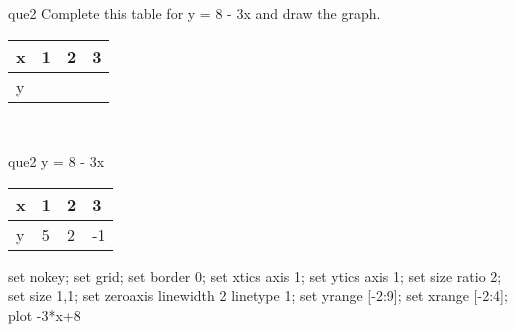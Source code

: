 \documentclass[13.5pt, varwidth=true]{beamer}
\begin{document}
\begin{frame}[shrink=19,fragile]
	\begin{beamercolorbox}[rounded=true, left, shadow=true,wd=14.8cm]{que2}
		 Complete this table for y = 8 - 3x and draw the graph. \\[0.3cm] \renewcommand{\arraystretch}{1.2}\begin{tabular}{|C|C|C|C|} \hline x & 1 & 2 & 3 \\ \hline y & & & \\ \hline \end{tabular}\\[0.3cm]
	\end{beamercolorbox}
\end{frame}
\begin{frame}[shrink=19,fragile]
	\begin{beamercolorbox}[rounded=true, left, shadow=true,wd=14.8cm]{que2}
		y = 8 - 3x\renewcommand{\arraystretch}{1.2}\begin{tabular}{|C|C|C|C|} \hline x & 1 & 2 & 3 \\ \hline y & 5 & 2 & -1\\ \hline \end{tabular}\begin{gnuplot}[terminal=pdf] set nokey; set grid; set border 0; set xtics axis 1; set ytics axis 1; set size ratio 2; set size 1,1; set zeroaxis linewidth 2 linetype 1; set yrange [-2:9]; set xrange [-2:4]; plot -3*x+8 \end{gnuplot}
	\end{beamercolorbox}
\end{frame}
\end{document}
